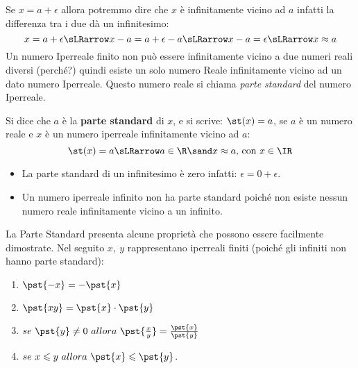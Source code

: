Se \(x=a+\epsilon\) allora potremmo dire che \(x\) è infinitamente vicino 
ad \(a\) infatti la differenza tra i due dà un infinitesimo: 
\[x=a+\epsilon \sLRarrow
x-a = a+\epsilon-a \sLRarrow x-a = \epsilon \sLRarrow x \approx a\]
Un numero Iperreale finito non può essere infinitamente vicino 
a due numeri reali diversi (perché?) quindi esiste un solo numero Reale 
infinitamente vicino ad un dato numero Iperreale. 
Questo numero reale si chiama \emph{parte standard} del numero Iperreale.

% 

\begin{definizione}
 Si dice che \(a\) è la \textbf{parte standard} di \(x\), e si scrive: 
 \(\st(x) = a\), se \(a\) è un numero reale e \(x\) è un numero iperreale
infinitamente vicino ad \(a\):
\[\st(x) = a \sLRarrow a \in \R \sand x \approx a\mbox{, con }x\in \IR\]
\end{definizione}
\begin{osservazione}
\begin{itemize} [nosep]
 \item 
La parte standard di un infinitesimo è zero infatti:
\(\epsilon = 0+\epsilon\).
 \item 
Un numero iperreale infinito non ha parte standard poiché non esiste nessun 
numero reale infinitamente vicino a un infinito.
\end{itemize}
\end{osservazione}
\vspace{1em}
La Parte Standard presenta alcune proprietà che possono essere facilmente 
dimostrate. Nel seguito \(x,\ y\) rappresentano iperreali finiti 
(poiché gli infiniti non hanno parte standard):
\begin{multicols}{2}
\begin{enumerate} [nosep]
 \item \(\pst{-x} = -\pst{x}\)
 \item \(\pst{xy} = \pst{x} \cdot \pst{y}\)
 \item \(se ~ \pst{y} \neq 0 ~ allora ~
 \pst{\frac{x}{y}} = \frac{\pst{x}}{\pst{y}}\)
 \item \(se ~  x \leqslant y ~ allora ~ 
 \pst{x} \leqslant \pst{y}\).
\end{enumerate}
\end{multicols}


